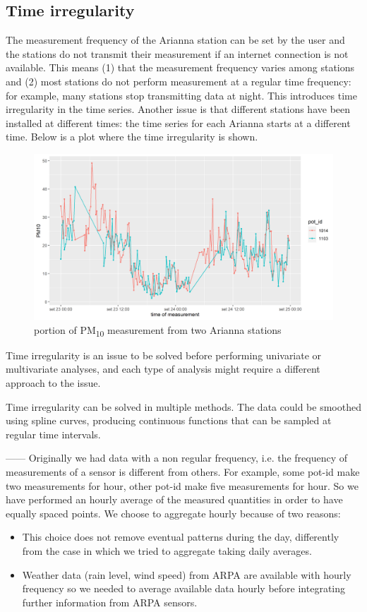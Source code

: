 \documentclass{article}
\begin{document}
\subsection{Time irregularity}

The measurement frequency of the Arianna station can be set by the user and the stations do not transmit their measurement if
an internet connection is not
available. This means (1) that the measurement frequency varies among stations and (2) most stations do not perform measurement
at a regular time frequency:
for example, many stations stop transmitting data at night. This introduces time irregularity in the time series.
Another issue is that different stations have been installed at different times: the time series for each Arianna starts at
a different time. Below is a plot where the time irregularity is shown.

\begin{figure}[h!]
  \centering
  \includegraphics[width=5in]{timeIrregularity.png}
  \caption{portion of PM\textsubscript{10} measurement from two Arianna stations}
\end{figure}

Time irregularity is an issue to be solved before performing univariate or multivariate analyses, and each type of analysis might require a different approach to the issue.

Time irregularity can be solved in multiple methods. The data could be smoothed using spline curves, producing continuous
functions that can be sampled at regular time intervals. 

------
Originally we had data with a non regular frequency, i.e. the frequency of measurements of a sensor 
is different from others. For example, some pot-id make two measurements for hour, other pot-id make 
five measurements for hour. So we have performed an hourly average of the measured quantities in order to have equally spaced points. We choose to aggregate hourly because of two reasons: 
\begin{itemize}
\item This choice does not remove eventual patterns during the day, differently from the case in which we tried to aggregate taking daily averages. 
\item Weather data (rain level, wind speed) from ARPA are available with hourly frequency so we needed to average 
available data hourly before integrating further information from ARPA sensors. 
\end{itemize}
\end{document}
